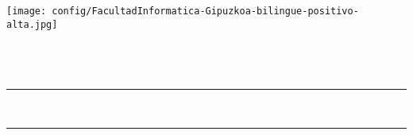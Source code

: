 \thispagestyle{empty}

\newcommand{\HRule}{\rule{\linewidth}{0.5mm}} 

\thispagestyle{empty}
\begin{center}
	
  \texttt{[image: config/FacultadInformatica-Gipuzkoa-bilingue-positivo-alta.jpg]} \\[2cm]
  
  
  {\LARGE {\gapizenburua}}\\[0.5cm]
  {\Large \ikasketak}\\[0.25cm]
  {\espezialitatea}\\[2cm]
  
  
  \HRule \\[0.5cm]
  {\LARGE 
    \textbf{\izenburua}
  }
  \HRule \\[0.5cm]

  \Large \textsl{\egilea}\\
  
   
  \vfill
  
  \textbf{\zuzendariaktestua}\\
  \zuzendariak\\[2cm]
  
  \data

\end{center}
